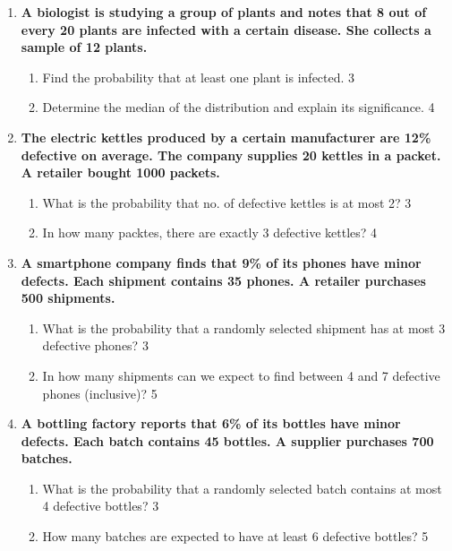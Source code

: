 \documentclass[a4paper,oneside, margin=1.4in]{book}
\begin{document}
\begin{enumerate}
\begin{enumerate}
		[Hint: For a binomial distribution, $\gamma_1 = \frac{q-p}{\sqrt{npq}}$]
  \end{enumerate}
  
  \item
	  \textbf{A biologist is studying a group of plants and notes that 8 out of every 20 plants are infected with a certain disease. She collects a sample of 12 plants.} 
  
  \begin{enumerate}
    \item  
	Find the probability that at least one plant is infected. \hfill 3
    \item
	Determine the median of the distribution and explain its significance. \hfill 4
  \end{enumerate}


 \item
	  \textbf{The electric kettles produced by a certain manufacturer are 12\% 
	  defective on average. The company supplies 20 kettles in a packet. A retailer
	  bought 1000 packets.} 
  
  \begin{enumerate}
    \item  
	What is the probability that no. of defective kettles is at most 2? \hfill 3
    \item
	In how many packtes, there are exactly 3 defective kettles? \hfill 4
  \end{enumerate}
  
  \item  
  \textbf{A smartphone company finds that 9\% of its phones have minor defects. Each shipment contains 35 phones. A retailer purchases 500 shipments.}  

  \begin{enumerate}  
    \item  
      What is the probability that a randomly selected shipment has at most 3 defective phones? \hfill 3  
    \item  
      In how many shipments can we expect to find between 4 and 7 defective phones (inclusive)? \hfill 5  
  \end{enumerate}  

\item  
  \textbf{A bottling factory reports that 6\% of its bottles have minor defects. Each batch contains 45 bottles. A supplier purchases 700 batches.}  

  \begin{enumerate}  
    \item  
      What is the probability that a randomly selected batch contains at most 4 defective bottles? \hfill 3  
    \item  
      How many batches are expected to have at least 6 defective bottles? \hfill 5  
  \end{enumerate}  


\end{enumerate}
\end{document}
